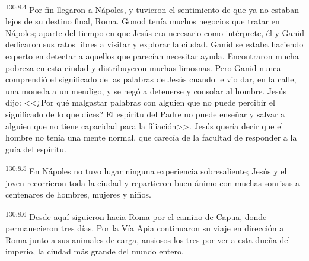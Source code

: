\par 
\textsuperscript{130:8.4} Por fin llegaron a Nápoles, y tuvieron el sentimiento de que ya no estaban lejos de su destino final, Roma. Gonod tenía muchos negocios que tratar en Nápoles; aparte del tiempo en que Jesús era necesario como intérprete, él y Ganid dedicaron sus ratos libres a visitar y explorar la ciudad. Ganid se estaba haciendo experto en detectar a aquellos que parecían necesitar ayuda. Encontraron mucha pobreza en esta ciudad y distribuyeron muchas limosnas. Pero Ganid nunca comprendió el significado de las palabras de Jesús cuando le vio dar, en la calle, una moneda a un mendigo, y se negó a detenerse y consolar al hombre. Jesús dijo: <<¿Por qué malgastar palabras con alguien que no puede percibir el significado de lo que dices? El espíritu del Padre no puede enseñar y salvar a alguien que no tiene capacidad para la filiación>>. Jesús quería decir que el hombre no tenía una mente normal, que carecía de la facultad de responder a la guía del espíritu.

\par 
\textsuperscript{130:8.5} En Nápoles no tuvo lugar ninguna experiencia sobresaliente; Jesús y el joven recorrieron toda la ciudad y repartieron buen ánimo con muchas sonrisas a centenares de hombres, mujeres y niños.

\par 
\textsuperscript{130:8.6} Desde aquí siguieron hacia Roma por el camino de Capua, donde permanecieron tres días. Por la Vía Apia continuaron su viaje en dirección a Roma junto a sus animales de carga, ansiosos los tres por ver a esta dueña del imperio, la ciudad más grande del mundo entero.